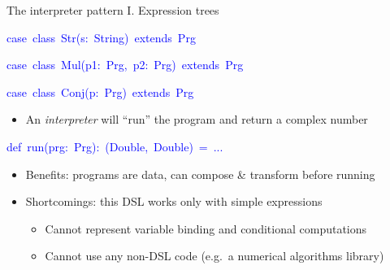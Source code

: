 \documentclass[english,,russian]{beamer}
\newenvironment{lyxcode}
  {\par\begin{list}{}{
    \setlength{\rightmargin}{\leftmargin}
    \setlength{\listparindent}{0pt}%
    \raggedright
    \setlength{\itemsep}{0pt}
    \setlength{\parsep}{0pt}
    \normalfont\ttfamily}%
   \def\{{\char`\{}
   \def\}{\char`\}}
   \def\textasciitilde{\char`\~}
   \item[]}
  {\end{list}}
\begin{document}
\begin{frame}{The interpreter pattern I. Expression trees}
\begin{lyxcode}
\textcolor{blue}{\footnotesize{}case~class~Str(s:~String)~extends~Prg}{\footnotesize\par}

\textcolor{blue}{\footnotesize{}case~class~Mul(p1:~Prg,~p2:~Prg)~extends~Prg}{\footnotesize\par}

\textcolor{blue}{\footnotesize{}case~class~Conj(p:~Prg)~extends~Prg}{\footnotesize\par}
\end{lyxcode}
\begin{itemize}
\item An \emph{interpreter} will ``run'' the program and return a complex
number
\end{itemize}
\begin{lyxcode}
\textcolor{blue}{\footnotesize{}def~run(prg:~Prg):~(Double,~Double)~=~...}{\footnotesize\par}
\end{lyxcode}
\begin{itemize}
\item Benefits: programs are data, can compose \& transform before running
\item Shortcomings: this DSL works only with simple expressions
\begin{itemize}
\item Cannot represent variable binding and conditional computations
\item Cannot use any non-DSL code (e.g.~a numerical algorithms library)
\end{itemize}
\end{itemize}
\end{frame}
\end{document}
